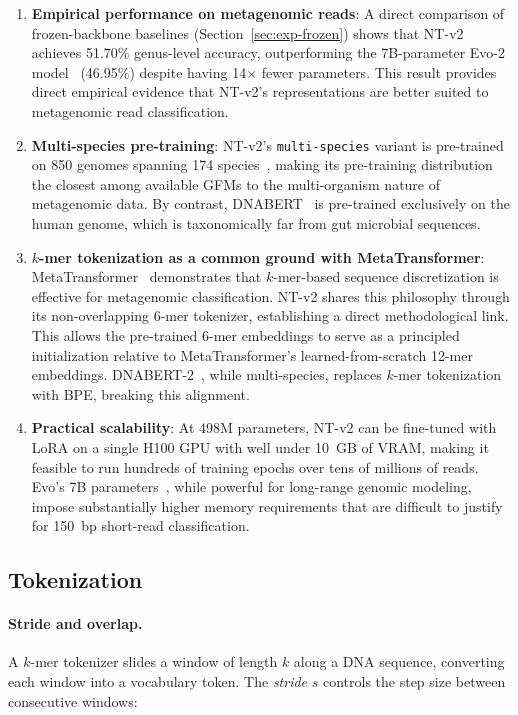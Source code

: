 \begin{enumerate}
    \item \textbf{Empirical performance on metagenomic reads}: A direct comparison of frozen-backbone baselines (Section~\ref{sec:exp-frozen}) shows that NT-v2 achieves 51.70\% genus-level accuracy, outperforming the 7B-parameter Evo-2 model~\cite{Brixi2025} (46.95\%) despite having 14$\times$ fewer parameters. This result provides direct empirical evidence that NT-v2's representations are better suited to metagenomic read classification.

    \item \textbf{Multi-species pre-training}: NT-v2's \texttt{multi-species} variant is pre-trained on 850 genomes spanning 174 species~\cite{DallaTorre2023}, making its pre-training distribution the closest among available GFMs to the multi-organism nature of metagenomic data. By contrast, DNABERT~\cite{Ji2021} is pre-trained exclusively on the human genome, which is taxonomically far from gut microbial sequences.

    \item \textbf{$k$-mer tokenization as a common ground with MetaTransformer}: MetaTransformer~\cite{Wichmann2023} demonstrates that $k$-mer-based sequence discretization is effective for metagenomic classification. NT-v2 shares this philosophy through its non-overlapping 6-mer tokenizer, establishing a direct methodological link. This allows the pre-trained 6-mer embeddings to serve as a principled initialization relative to MetaTransformer's learned-from-scratch 12-mer embeddings. DNABERT-2~\cite{Zhou2024dnabert2}, while multi-species, replaces $k$-mer tokenization with BPE, breaking this alignment.

    \item \textbf{Practical scalability}: At 498M parameters, NT-v2 can be fine-tuned with LoRA on a single H100 GPU with well under 10~GB of VRAM, making it feasible to run hundreds of training epochs over tens of millions of reads. Evo's 7B parameters~\cite{Nguyen2024}, while powerful for long-range genomic modeling, impose substantially higher memory requirements that are difficult to justify for 150~bp short-read classification.
\end{enumerate}

\subsection{Tokenization}

\paragraph{Stride and overlap.}
A $k$-mer tokenizer slides a window of length $k$ along a DNA sequence, converting each window into a vocabulary token. The \emph{stride} $s$ controls the step size between consecutive windows:

